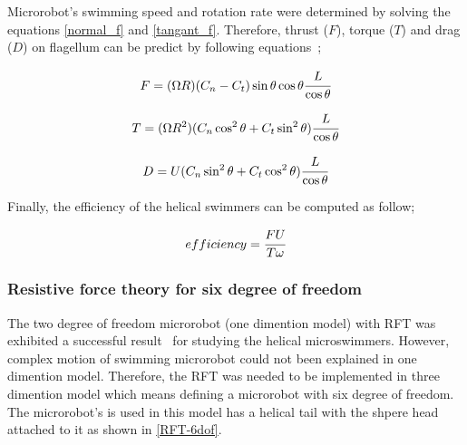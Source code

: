 \documentclass[12pt,a4paper,titlepage]{report}
\begin{document}
Microrobot\rq{}s swimming speed and rotation rate were determined by solving 
the equations \ref{normal_f} and \ref{tangant_f}. Therefore, thrust ($F$), torque ($T$) and drag ($D$) 
on flagellum can be predict by following equations~\citep{rodenborn2013propulsion};

\begin{equation}
 F = (\Omega R)(C_n - C_t) \sin \theta \cos \theta \cfrac{L}{\cos \theta} 
\label{thrust}
\end{equation}

\begin{equation}
 T = (\Omega R^2)(C_n \cos ^2 \theta + C_t \sin ^2 \theta) \cfrac{L}{\cos \theta}
\label{torque}
\end{equation}

\begin{equation}
 D = U (C_n \sin ^2 \theta + C_t \cos ^2 \theta) \cfrac{L}{\cos \theta} 
\label{drag}
\end{equation}



Finally, the efficiency of the helical swimmers can be computed as follow;



\begin{equation}
 efficiency = \cfrac{FU}{T \omega} 
\label{efficiency}
\end{equation}

 
\subsubsection{Resistive force theory for six degree of freedom}\label{RFT_sixDegree}
 



The two degree of freedom microrobot (one dimention model) with \ac*{RFT} was exhibited a successful result~\citep{mahoney2011velocity}
for studying the helical microswimmers. However, complex motion of swimming microrobot could not been 
explained in one dimention model. Therefore, the \ac*{RFT} was needed to be implemented in three dimention
model which means defining a microrobot with six degree of freedom. The microrobot\rq{}s is
used in this model has a helical tail with the shpere head attached to it as shown in \ref{RFT-6dof}.
\end{document}
